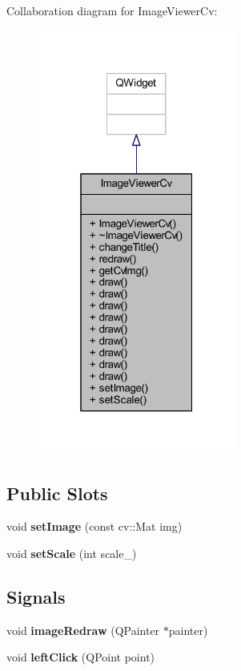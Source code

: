 Collaboration diagram for Image\+Viewer\+Cv\+:
\nopagebreak
\begin{figure}[H]
\begin{center}
\leavevmode
\includegraphics[width=184pt]{class_image_viewer_cv__coll__graph}
\end{center}
\end{figure}
\subsection*{Public Slots}
\begin{DoxyCompactItemize}
\item 
\hypertarget{class_image_viewer_cv_a3323846e9a9376888949975158332e17}{}void {\bfseries set\+Image} (const cv\+::\+Mat img)\label{class_image_viewer_cv_a3323846e9a9376888949975158332e17}

\item 
\hypertarget{class_image_viewer_cv_adcc344667008bee1385c17f3189941c2}{}void {\bfseries set\+Scale} (int scale\+\_\+)\label{class_image_viewer_cv_adcc344667008bee1385c17f3189941c2}

\end{DoxyCompactItemize}
\subsection*{Signals}
\begin{DoxyCompactItemize}
\item 
\hypertarget{class_image_viewer_cv_ab5837558f7336324b076b65ed996c378}{}void {\bfseries image\+Redraw} (Q\+Painter $\ast$painter)\label{class_image_viewer_cv_ab5837558f7336324b076b65ed996c378}

\item 
\hypertarget{class_image_viewer_cv_ad37e9312e6e740f5fdeba25d33bc3cfa}{}void {\bfseries left\+Click} (Q\+Point point)\label{class_image_viewer_cv_ad37e9312e6e740f5fdeba25d33bc3cfa}

\end{DoxyCompactItemize}
